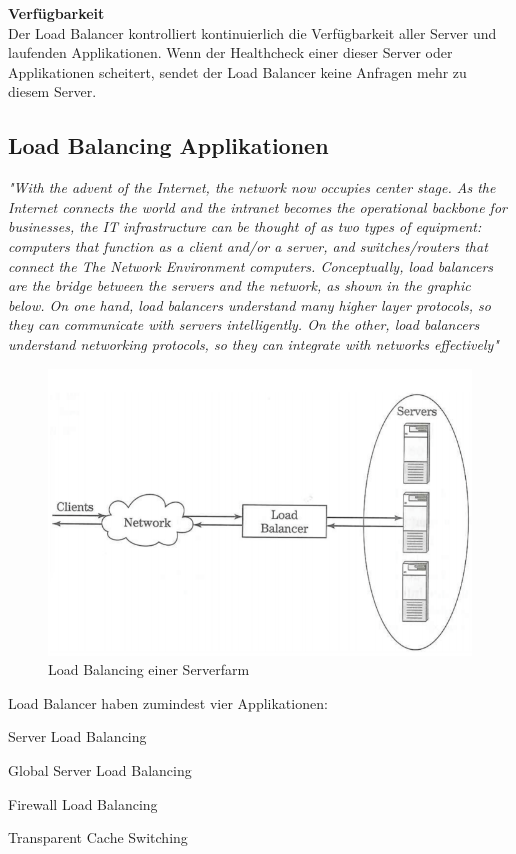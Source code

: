 \textbf{Verfügbarkeit} \\

Der Load Balancer kontrolliert kontinuierlich die Verfügbarkeit aller Server und laufenden Applikationen. Wenn der Healthcheck einer dieser Server oder Applikationen scheitert, sendet der Load Balancer keine Anfragen mehr zu diesem Server. \cite{LoadBalancing2}

\pagebreak
\subsection{Load Balancing Applikationen}
\label{sec:Load Balancing Applikationen}
\textit{"With the advent of the Internet, the network now occupies center stage. As the Internet connects the world and the intranet becomes the operational backbone for businesses, the IT infrastructure can be thought of as two types of equipment: computers that function as a client and/or a server, and switches/routers that connect the The Network Environment computers. Conceptually, load balancers are the bridge between the servers and the network, as shown in the graphic below. On one hand, load balancers understand many higher layer protocols, so they can communicate with servers intelligently. On the other, load balancers understand networking protocols, so they can integrate with networks effectively"}  \cite{LoadBalancing2}

\begin{figure}[!h]
	\begin{center}
		\includegraphics[width=0.6\linewidth]{images/loadbalancing2.jpg}
		\caption{Load Balancing einer Serverfarm \cite{LoadBalancing2}}
		\label{Load Balancing einer Serverfarm}
	\end{center}
\end{figure}

Load Balancer haben zumindest vier Applikationen:
\begin{list}{•}{}
\item Server Load Balancing
\item Global Server Load Balancing
\item Firewall Load Balancing
\item Transparent Cache Switching
\end{list}

